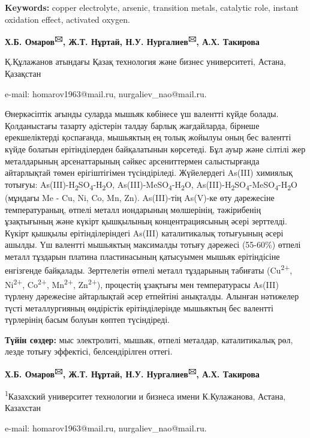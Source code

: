 {\bfseries Keywords:} copper electrolyte, arsenic, transition metals,
catalytic role, instant oxidation effect, activated oxygen.


\begin{center}
{\bfseries Х.Б. Омаров\textsuperscript{🖂}, Ж.Т. Нұртай, Н.У.
Нургалиев\textsuperscript{🖂}, А.Х. Такирова}

Қ.Құлажанов атындағы Қазақ технология және бизнес университеті, Астана,
Қазақстан

e-mail: homarov1963@mail.ru, nurgaliev\_nao@mail.ru.
\end{center}

Өнеркәсіптік ағынды суларда мышьяк көбінесе үш валентті күйде болады.
Қолданыстағы тазарту әдістерін талдау барлық жағдайларда, бірнеше
ерекшеліктерді қоспағанда, мышьяктың ең толық жойылуы оның бес валентті
күйде болатын ерітінділерден байқалатынын көрсетеді. Бұл ауыр және
сілтілі жер металдарының арсенаттарының сәйкес арсениттермен
салыстырғанда айтарлықтай төмен ерігіштігімен түсіндіріледі. Жүйелердегі
As(III) химиялық тотығуы:
As(III)-H\textsubscript{2}SO\textsubscript{4}-H\textsubscript{2}O,
As(III)-MeSO\textsubscript{4}-H\textsubscript{2}O,
As(III)-H\textsubscript{2}SO\textsubscript{4}-MeSO\textsubscript{4}-H\textsubscript{2}O
(мұндағы Me - Cu, Ni, Co, Mn, Zn). As(III)-тің As(V)-ке өту дәрежесіне
температураның, өтпелі металл иондарының мөлшерінің, тәжірибенің
ұзақтығының және күкірт қышқылының концентрациясының әсері зерттелді.
Күкірт қышқылы ерітінділеріндегі As(III) каталитикалық тотығуының әсері
ашылды. Үш валентті мышьяктың максималды тотығу дәрежесі (55-60\%)
өтпелі металл тұздарын платина пластинасының қатысуымен мышьяк
ерітіндісіне енгізгенде байқалады. Зерттелетін өтпелі металл тұздарының
табиғаты (Cu\textsuperscript{2+}, Ni\textsuperscript{2+},
Co\textsuperscript{2+}, Mn\textsuperscript{2+}, Zn\textsuperscript{2+}),
процестің ұзақтығы мен температурасы As(III) түрлену дәрежесіне
айтарлықтай әсер етпейтіні анықталды. Алынған нәтижелер түсті
металлургияның өндірістік ерітінділерінде мышьяктың бес валентті
түрлерінің басым болуын көптеп түсіндіреді.

{\bfseries Түйін сөздер:} мыс электролиті, мышьяк, өтпелі металдар,
каталитикалық рөл, лезде тотығу эффектісі, белсендірілген оттегі.


\begin{center}
{\bfseries Х.Б. Омаров\textsuperscript{🖂}, Ж.Т. Нұртай, Н.У.
Нургалиев\textsuperscript{🖂}, А.Х. Такирова}

\textsuperscript{1}Казахский университет технологии и бизнеса имени
К.Кулажанова, Астана, Казахстан

e-mail: homarov1963@mail.ru, nurgaliev\_nao@mail.ru.
\end{center}


